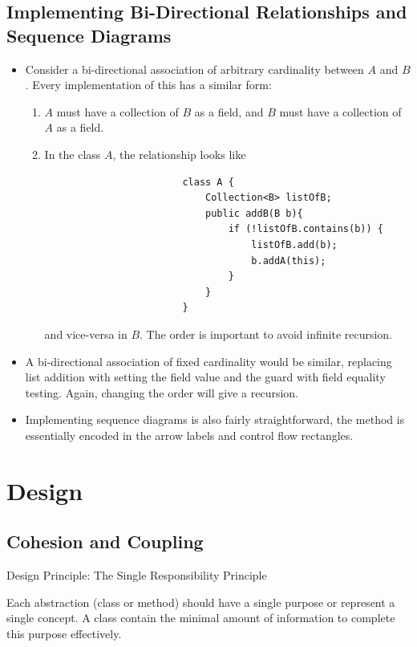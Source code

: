 \documentclass[letterpaper] {article}
\begin{document}
    \subsection{Implementing Bi-Directional Relationships and Sequence Diagrams}
    \begin{itemize}
        \item Consider a bi-directional association of arbitrary cardinality between $A$ and $B$. Every implementation of this has a similar form:
            \begin{enumerate}
                \item $A$ must have a collection of $B$ as a field, and $B$ must have a collection of $A$ as a field.
                \item In the class $A$, the relationship looks like
                    \begin{lstlisting}
                        class A {
                            Collection<B> listOfB;
                            public addB(B b){
                                if (!listOfB.contains(b)) {
                                    listOfB.add(b);
                                    b.addA(this);
                                }
                            }
                        }
                    \end{lstlisting}
                    and vice-versa in $B$. The order is important to avoid infinite recursion. 
            \end{enumerate}
        \item A bi-directional association of fixed cardinality would be similar, replacing list addition with setting the field value and the guard with field equality testing. Again, changing the order will give a recursion. 
        \item Implementing sequence diagrams is also fairly straightforward, the method is essentially encoded in the arrow labels and control flow rectangles. 
    \end{itemize}

    \newpage
    \section{Design}
    \subsection{Cohesion and Coupling}
 
    \begin{framed}
        \begin{center}
            Design Principle: The Single Responsibility Principle
        \end{center}
        Each abstraction (class or method) should have a single purpose or represent a single concept. A class contain the minimal amount of information to complete this purpose effectively. 
    \end{framed}
\end{document}
